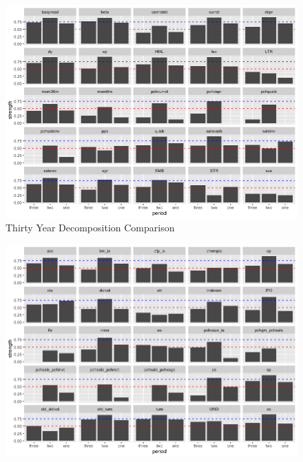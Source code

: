 \begin{landscape}
	\begin{figure}[ht]
		\centering
		\caption{Thirty Year Decomposition Comparison}
		\label{figure:thirty_decompose}
		\includegraphics[scale = 0.75]{thirty_decompose_I}
	\end{figure}
\end{landscape}


\begin{landscape}
	\begin{figure}[ht]
		\includegraphics[scale = 0.75]{thirty_decompose_II}
		\centering
	\end{figure}
\end{landscape}

